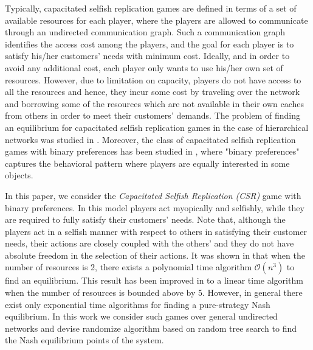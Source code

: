 Typically, capacitated selfish replication games are defined in terms of a set of available resources for each player, where the players are allowed to communicate through an undirected communication graph. Such a communication graph identifies the access cost among the players, and the goal for each player is to satisfy his/her customers' needs with minimum cost. Ideally, and in order to avoid any additional cost, each player only wants to use his/her own set of resources. However, due to limitation on capacity, players do not have access to all the resources and hence, they incur some cost by traveling over the network and borrowing some of the resources which are not available in their own caches from others in order to meet their customers' demands. The problem of finding an equilibrium for capacitated selfish replication games in the case of hierarchical networks was studied in \cite{gopalakrishnan2012cache}. Moreover, the class of capacitated selfish replication games with binary preferences has been studied in \cite{gopalakrishnan2012cache,etesami2014pure}, where "binary preferences" captures the behavioral pattern where players are equally interested in some objects.

In this paper, we consider the \emph{Capacitated Selfish Replication (CSR)} game with binary preferences. In this model players act myopically and selfishly, while they are required to fully satisfy their customers' needs. Note that, although the players act in a selfish manner with respect to others in satisfying their customer needs, their actions are closely coupled with the others' and they do not have absolute freedom in the selection of their actions. It was shown in \cite{gopalakrishnan2012cache} that when the number of resources is 2, there exists a polynomial time algorithm $\mathcal{O}(n^3)$ to find an equilibrium. This result has been improved in \cite{etesami2014pure} to a linear time algorithm when the number of resources is bounded above by 5. However, in general there exist only exponential time algorithms for finding a pure-strategy Nash equilibrium. In this work we consider such games over general undirected networks and devise randomize algorithm based on random tree search to find the Nash equilibrium points of the system.


